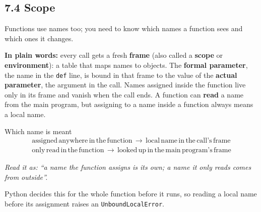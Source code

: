 \documentclass[11pt]{article}
\begin{document}
\begin{keepsection}
\section{7.4 Scope}

Functions use names too; you need to know which names a function sees and which ones it changes.

\begin{plainbox}\textbf{In plain words:} every call gets a fresh \textbf{frame} (also called a \textbf{scope} or \textbf{environment}): a table that maps names to objects. The \textbf{formal parameter}, the name in the \texttt{def} line, is bound in that frame to the value of the \textbf{actual parameter}, the argument in the call. Names assigned inside the function live only in its frame and vanish when the call ends. A function can \textbf{read} a name from the main program, but assigning to a name inside a function always means a local name.\end{plainbox}

\begin{equationcard}{Which name is meant}
\[ \begin{gathered} \text{assigned}\, \text{anywhere}\, \text{in}\, \text{the}\, \text{function}\, \to \, \text{local}\, \text{name}\, \text{in}\, \text{the}\, \text{call}’\mathrm{s}\, \text{frame} \\ \text{only}\, \text{read}\, \text{in}\, \text{the}\, \text{function}\, \to \, \text{looked}\, \text{up}\, \text{in}\, \text{the}\, \text{main}\, \text{program}’\mathrm{s}\, \text{frame} \end{gathered} \]
{\small \emph{Read it as: “a name the function assigns is its own; a name it only reads comes from outside”.}\par  Python decides this for the whole function before it runs, so reading a local name before its assignment raises an \texttt{UnboundLocalError}.}
\end{equationcard}


\end{keepsection}
\end{document}
